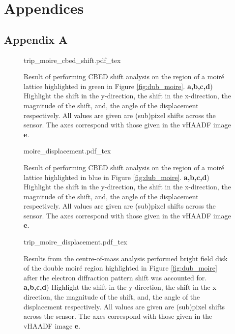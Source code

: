 \chapter{Appendices}

\section{Appendix A}
\label{appendix:a}

\begin{figure}[h]
    \centering
    \def\svgwidth{.7\linewidth}
    {trip_moire_cbed_shift.pdf_tex}
    \caption{Result of performing CBED shift analysis on the region of a moiré lattice highlighted in green in Figure \ref{fig:dub_moire}. \textbf{a,b,c,d}) Highlight the shift in the y-direction, the shift in the x-direction, the magnitude of the shift, and, the angle of the displacement respectively. All values are given are (sub)pixel shifts across the sensor. The axes correspond with those given in the vHAADF image \textbf{e}.}
    \label{fig:appendix_cbed_trip_moire}
\end{figure}
\newpage


\begin{figure}[h]
    \centering
    \def\svgwidth{.95\linewidth}
    {moire_displacement.pdf_tex}
    \caption{Result of performing CBED shift analysis on the region of a moiré lattice highlighted in blue in Figure \ref{fig:dub_moire}. \textbf{a,b,c,d}) Highlight the shift in the y-direction, the shift in the x-direction, the magnitude of the shift, and, the angle of the displacement respectively. All values are given are (sub)pixel shifts across the sensor. The axes correspond with those given in the vHAADF image \textbf{e}.}
    \label{fig:m_dis}
\end{figure}


\begin{figure}[h]
    \centering
    \def\svgwidth{.95\linewidth}
    {trip_moire_displacement.pdf_tex}
    \caption{Results from the centre-of-mass analysis performed bright field disk of the double moiré region highlighted in Figure \ref{fig:dub_moire} after the electron diffraction pattern shift was accounted for. \textbf{a,b,c,d}) Highlight the shift in the y-direction, the shift in the x-direction, the magnitude of the shift, and, the angle of the displacement respectively. All values are given are (sub)pixel shifts across the sensor. The axes correspond with those given in the vHAADF image \textbf{e}.}
    \label{fig:trip_m_dis}
\end{figure}
